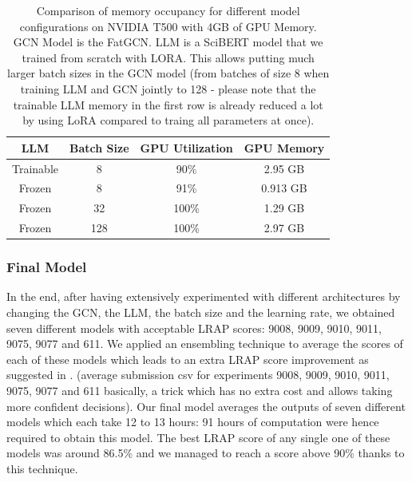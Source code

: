 \begin{table}[!]
    \centering
    \begin{tabular}{|cccc|}
    \hline
    \textbf{LLM} & \textbf{Batch Size} &\textbf{GPU Utilization}& \textbf{GPU Memory} \\ \hline
    Trainable & 8 & 90\% & 2.95 GB \\
    Frozen & 8 & 91\% & 0.913 GB \\
    Frozen & 32 & 100\% & 1.29 GB \\
    Frozen & 128 & 100\% & 2.97 GB \\
    \hline
    \end{tabular}
    \caption{Comparison of memory occupancy for different model configurations on NVIDIA T500 with 4GB of GPU Memory. GCN Model is the FatGCN. LLM is a SciBERT model that we trained from scratch with LORA. This allows putting much larger batch sizes in the GCN model (from batches of size 8 when training LLM and GCN jointly to 128 - please note that the trainable LLM memory in the first row is already reduced a lot by using LoRA compared to traing all parameters at once).}
    \label{table:ft_gcn_model_memory_occupancy}
\end{table}
\subsubsection{Final Model}
In the end, after having extensively experimented with different architectures by changing the GCN, the LLM, the batch size and the learning rate, we obtained seven different models with acceptable LRAP scores: 9008, 9009, 9010, 9011, 9075, 9077 and 611.
We applied an ensembling technique to average the scores of each of these models which leads to an extra LRAP score improvement as suggested in \cite{text2mol}. (average submission csv for experiments 9008, 9009, 9010, 9011, 9075, 9077 and 611 basically, a trick which has no extra cost and allows taking more confident decisions). Our final model averages the outputs of seven different models which each take 12 to 13 hours: 91 hours of computation were hence required to obtain this model.
The best LRAP score of any single one of these models was around 86.5\% and we managed to reach a score above 90\% thanks to this technique.
